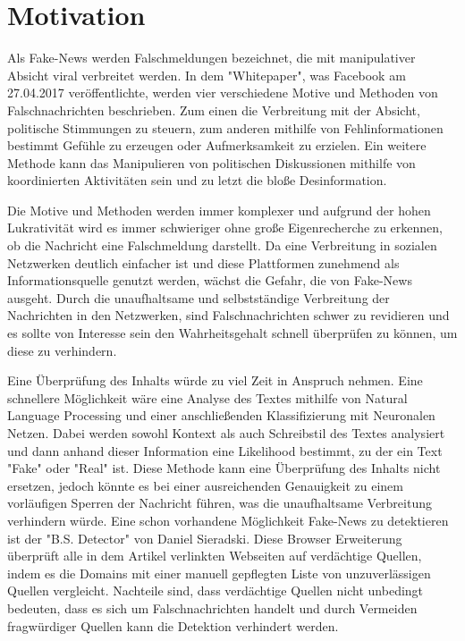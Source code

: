 \chapter{Motivation}
\label{sec:motivation}

Als Fake-News werden Falschmeldungen bezeichnet, die mit manipulativer Absicht viral verbreitet werden. In dem 
"Whitepaper"\cite{facebook}, was Facebook am 27.04.2017 veröffentlichte, werden vier verschiedene Motive und  
Methoden von Falschnachrichten beschrieben. 
Zum einen die Verbreitung mit der Absicht, politische Stimmungen 
zu steuern, zum anderen mithilfe von Fehlinformationen bestimmt Gefühle zu erzeugen oder Aufmerksamkeit zu erzielen. 
Ein weitere Methode kann das Manipulieren von politischen Diskussionen mithilfe von koordinierten Aktivitäten sein und 
zu letzt die bloße Desinformation.

Die Motive und Methoden werden immer komplexer und aufgrund der hohen Lukrativität\cite{Cynk} wird es immer schwieriger 
ohne große Eigenrecherche zu erkennen, ob die Nachricht eine Falschmeldung darstellt.
Da eine Verbreitung in sozialen Netzwerken deutlich einfacher ist und diese Plattformen zunehmend als
Informationsquelle genutzt werden\cite{nachrichtenquelle}, wächst die Gefahr, die von Fake-News ausgeht.
Durch die unaufhaltsame und selbstständige Verbreitung der Nachrichten in den Netzwerken, sind Falschnachrichten schwer 
zu revidieren und es sollte von Interesse sein den Wahrheitsgehalt schnell überprüfen zu können, um diese
zu verhindern.

Eine Überprüfung des Inhalts würde zu viel Zeit in Anspruch nehmen. Eine schnellere Möglichkeit wäre eine Analyse 
des Textes mithilfe von Natural Language Processing und einer anschließenden Klassifizierung mit Neuronalen Netzen.
Dabei werden sowohl Kontext als auch Schreibstil des Textes analysiert und dann anhand dieser Information eine 
Likelihood bestimmt, zu der ein Text "Fake" oder "Real" ist.
Diese Methode kann eine Überprüfung des Inhalts nicht ersetzen, 
jedoch könnte es bei einer ausreichenden Genauigkeit zu einem vorläufigen Sperren der Nachricht führen, was die 
unaufhaltsame Verbreitung verhindern würde.
Eine schon vorhandene Möglichkeit Fake-News zu detektieren ist der "B.S. Detector" von Daniel Sieradski\cite{BS}.
Diese Browser Erweiterung überprüft alle in dem Artikel verlinkten Webseiten auf verdächtige Quellen, indem es die 
Domains mit einer manuell gepflegten Liste von unzuverlässigen Quellen vergleicht. 
Nachteile sind, dass verdächtige Quellen nicht unbedingt bedeuten, dass es sich um 
Falschnachrichten handelt und durch Vermeiden fragwürdiger Quellen kann die Detektion verhindert werden.


